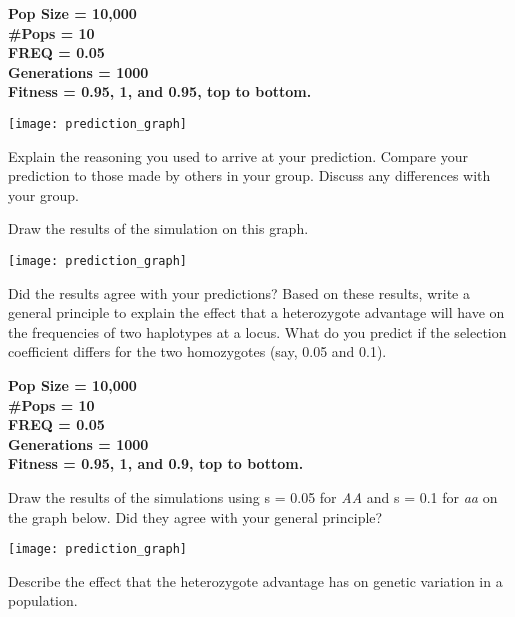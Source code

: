 \documentclass[11pt, addpoints]{exam}
\begin{document}
\begin{questions}
\ifprintanswers
	{\bfseries %
	Pop Size = 10,000\\
	\#Pops = 10\\
	FREQ = 0.05\\
	Generations = 1000\\	
	Fitness = 0.95, 1, and 0.95, top to bottom. }\vspace*{16\baselineskip}
\else
	\begin{center}
		\texttt{[image: prediction\_graph]}
	\end{center}
\fi

\question
Explain the reasoning you used to arrive at your
prediction. Compare your prediction to those made by others in your
group. Discuss any differences with your group.

\newpage

\question
Draw the results of the simulation on this graph.
	\begin{center}
		\texttt{[image: prediction\_graph]}
	\end{center}

\question[2]
Did the results agree with your predictions? Based on these
results, write a general principle to explain the effect that a
heterozygote advantage will have on the frequencies of two haplotypes at
a locus. What do you predict if the selection coefficient differs for
the two homozygotes (say, 0.05 and 0.1).

\ifprintanswers
	{\bfseries %
	Pop Size = 10,000\\
	\#Pops = 10\\
	FREQ = 0.05\\
	Generations = 1000\\	
	Fitness = 0.95, 1, and 0.9, top to bottom. }
\fi

\newpage

\question
Draw the results of the simulations using s = 0.05 for
\emph{AA} and s = 0.1 for \emph{aa} on the graph below. Did they agree
with your general principle?
	\begin{center}
		\texttt{[image: prediction\_graph]}
	\end{center}

\question[1]
Describe the effect that the heterozygote advantage has on
genetic variation in a population.



\end{questions}
\end{document}
